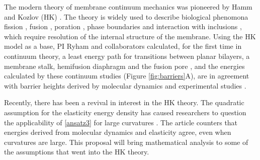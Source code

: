 The modern theory of membrane continuum mechanics 
was pioneered by Hamm and Kozlov (HK) \cite{Hamm2000}.
The theory is widely used to describe biological phenomona 
fission \cite{FrEsAkSh15, Maetal15, PhysRevE.79.031926},
fusion \cite{ChKo08, KoKo2002,Kuzmin7235,Aeffner2012},
poration \cite{Gaetal20}, phase boundaries and interaction with inclusions
\cite{SeLeMaEg17,Saetal20, Pietal20}, which require resolution of the internal structure of the membrane.  
Using the HK  model as a base,
PI Ryham and collaborators calculated, for the first time in continuum theory, a least energy path for transitions between planar bilayers, a membrane stalk,
hemifusion diaphragm and the fusion pore \cite{RyWaCo13,RyKlYaCo16},
and the energies calculated by these continuum studies (Figure \ref{fig:barriers}A),
are in agreement with barrier heights derived by molecular dynamics and experimental studies \cite{FrRoPi17}.  

Recently, there has been a revival in interest in the HK theory. The quadratic assumption
for the elasticity energy density has caused researchers to question the applicability of \eqref{ansatz3} for large curvatures \cite{PhysRevLett.117.188102, ARGUDO20161619}. 
The article \cite{C9SM02079A} counters that energies derived from molecular dynamics and elasticity agree, even when curvatures are large.
This proposal will bring mathematical analysis to some of the assumptions 
that went into the HK theory. 

\begin{figure}
  \caption{\label{fig:deformations}
    }
\end{figure}

